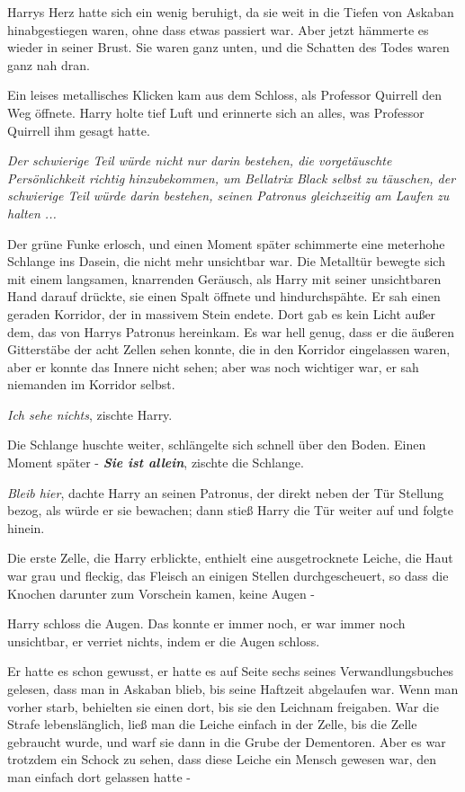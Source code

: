 Harrys Herz hatte sich ein wenig beruhigt, da sie weit in die Tiefen von Askaban
hinabgestiegen waren, ohne dass etwas passiert war. Aber jetzt hämmerte es
wieder in seiner Brust. Sie waren ganz unten, und die Schatten des Todes waren
ganz nah dran.

Ein leises metallisches Klicken kam aus dem Schloss, als Professor Quirrell den
Weg öffnete. Harry holte tief Luft und erinnerte sich an alles, was Professor
Quirrell ihm gesagt hatte.

\emph{Der schwierige Teil würde nicht nur darin bestehen, die vorgetäuschte
Persönlichkeit richtig hinzubekommen, um Bellatrix Black selbst zu täuschen,
der schwierige Teil würde darin bestehen, seinen Patronus gleichzeitig am
Laufen zu halten ...}

Der grüne Funke erlosch, und einen Moment später schimmerte eine meterhohe
Schlange ins Dasein, die nicht mehr unsichtbar war. Die Metalltür bewegte sich
mit einem langsamen, knarrenden Geräusch, als Harry mit seiner unsichtbaren Hand
darauf drückte, sie einen Spalt öffnete und hindurchspähte. Er sah einen geraden
Korridor, der in massivem Stein endete. Dort gab es kein Licht außer dem, das
von Harrys Patronus hereinkam. Es war hell genug, dass er die äußeren
Gitterstäbe der acht Zellen sehen konnte, die in den Korridor eingelassen waren,
aber er konnte das Innere nicht sehen; aber was noch wichtiger war, er sah
niemanden im Korridor selbst.

\glqq{}\emph{Ich sehe nichts}\grqq{}, zischte Harry.

Die Schlange huschte weiter, schlängelte sich schnell über den Boden. Einen
Moment später - \glqq{}\textbf{\emph{Sie ist allein}}\grqq{}, zischte die
Schlange.

\emph{Bleib hier}, dachte Harry an seinen Patronus, der direkt neben der Tür
Stellung bezog, als würde er sie bewachen; dann stieß Harry die Tür weiter auf
und folgte hinein.

Die erste Zelle, die Harry erblickte, enthielt eine ausgetrocknete Leiche, die
Haut war grau und fleckig, das Fleisch an einigen Stellen durchgescheuert, so
dass die Knochen darunter zum Vorschein kamen, keine Augen -

Harry schloss die Augen. Das konnte er immer noch, er war immer noch unsichtbar,
er verriet nichts, indem er die Augen schloss.

Er hatte es schon gewusst, er hatte es auf Seite sechs seines Verwandlungsbuches
gelesen, dass man in Askaban blieb, bis seine Haftzeit abgelaufen war. Wenn man
vorher starb, behielten sie einen dort, bis sie den Leichnam freigaben. War die
Strafe lebenslänglich, ließ man die Leiche einfach in der Zelle, bis die Zelle
gebraucht wurde, und warf sie dann in die Grube der Dementoren. Aber es war
trotzdem ein Schock zu sehen, dass diese Leiche ein Mensch gewesen war, den man
einfach dort gelassen hatte -

